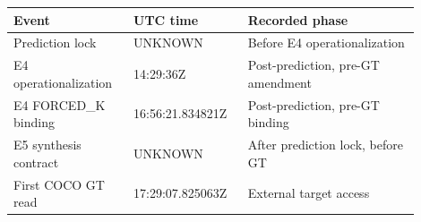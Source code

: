 \begin{center}\begin{minipage}{\linewidth}\centering\small
{}
\label{tab:freeze-timeline}
\begin{tabular}{p{0.26\linewidth}p{0.25\linewidth}p{0.39\linewidth}}\toprule
Event & UTC time & Recorded phase \\\midrule
Prediction lock & UNKNOWN & Before E4 operationalization \\
E4 operationalization & 14:29:36Z & Post-prediction, pre-GT amendment \\
E4 FORCED\_K binding & 16:56:21.834821Z & Post-prediction, pre-GT binding \\
E5 synthesis contract & UNKNOWN & After prediction lock, before GT \\
First COCO GT read & 17:29:07.825063Z & External target access \\
\bottomrule\end{tabular}
\end{minipage}\end{center}
